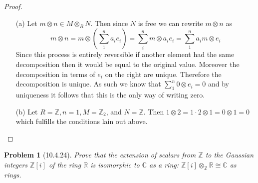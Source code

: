 \documentclass[10pt]{article}
\newcommand{\sk}{\vskip 10mm}
\newcommand{\bb}[1]{\mathbb{#1}}
\theoremstyle{plain}
\newtheorem{problem}{Problem}
\theoremstyle{remark}
\begin{document}
\begin{proof}
  \begin{enumerate}
  \item[(a)] Let $m\otimes n\in M\otimes_R N$. Then since $N$ is free we can rewrite $m\otimes n$ as
    \[
      m\otimes n = m \otimes \left(\sum_1^n a_i e_i\right) = \sum_i^n m\otimes a_i e_i= \sum_1^n a_i m \otimes e_i
    \]
    Since this process is entirely reversible if another element had the same
    decomposition then it would be equal to the original value. Moreover the decomposition
    in terms of $e_i$ on the right are unique. Therefore the decomposition is unique.
    As such we know that $\sum_1^n 0\otimes e_i=0 $ and by uniqueness it follows that this is the
    only way of writing zero.
  \item[(b)] Let $R=\bb{Z},n=1,M=\bb{Z}_2$, and $N=\bb{Z}$. Then $1\otimes 2=1\cdot 2\otimes 1=0\otimes 1=0$
    which fulfills the conditions lain out above.
  \end{enumerate}
\end{proof}

\sk

\begin{problem}[10.4.24]
  Prove that the extension of scalars from $\bb{Z}$ to the Gaussian integers
  $\bb{Z}[i]$ of the ring $\bb{R}$ is isomorphic to $\bb{C}$ as a ring:
  $\bb{Z}[i]\otimes_{\bb{Z}}\bb{R}\cong\bb{C}$ as rings.
\end{problem}
\end{document}
